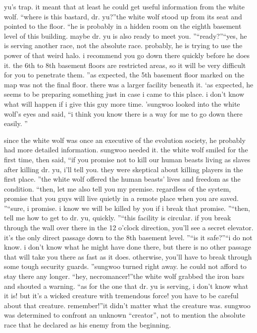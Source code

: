  yu’s trap.
it meant that at least he could get useful information from the white wolf.
“where is this bastard, dr.
 yu?”the white wolf stood up from its seat and pointed to the floor.
“he is probably in a hidden room on the eighth basement level of this building.
 maybe dr.
 yu is also ready to meet you.
”“ready?”“yes, he is serving another race, not the absolute race.
 probably, he is trying to use the power of that weird halo.
 i recommend you go down there quickly before he does it.
 the 6th to 8th basement floors are restricted areas, so it will be very difficult for you to penetrate them.
”as expected, the 5th basement floor marked on the map was not the final floor.
 there was a larger facility beneath it.
‘as expected, he seems to be preparing something just in case i came to this place.
 i don’t know what will happen if i give this guy more time.
’sungwoo looked into the white wolf’s eyes and said, “i think you know there is a way for me to go down there easily.
”

since the white wolf was once an executive of the evolution society, he probably had more detailed information.
 sungwoo needed it.
the white wolf smiled for the first time, then said, “if you promise not to kill our human beasts living as slaves after killing dr.
 yu, i’ll tell you.
 they were skeptical about killing players in the first place.
”the white wolf offered the human beasts’ lives and freedom as the condition.
“then, let me also tell you my premise.
 regardless of the system, promise that you guys will live quietly in a remote place when you are saved.
”“sure, i promise.
 i know we will be killed by you if i break that promise.
”“then, tell me how to get to dr.
 yu, quickly.
”“this facility is circular.
 if you break through the wall over there in the 12 o’clock direction, you’ll see a secret elevator.
 it’s the only direct passage down to the 8th basement level.
”“is it safe?”“i do not know.
 i don’t know what he might have done there, but there is no other passage that will take you there as fast as it does.
 otherwise, you’ll have to break through some tough security guards.
”sungwoo turned right away.
 he could not afford to stay there any longer.
“hey, necromancer!”the white wolf grabbed the iron bars and shouted a warning.
“as for the one that dr.
 yu is serving, i don’t know what it is! but it’s a wicked creature with tremendous force! you have to be careful about that creature.
 remember!”it didn’t matter what the creature was.
sungwoo was determined to confront an unknown “creator”, not to mention the absolute race that he declared as his enemy from the beginning.


 